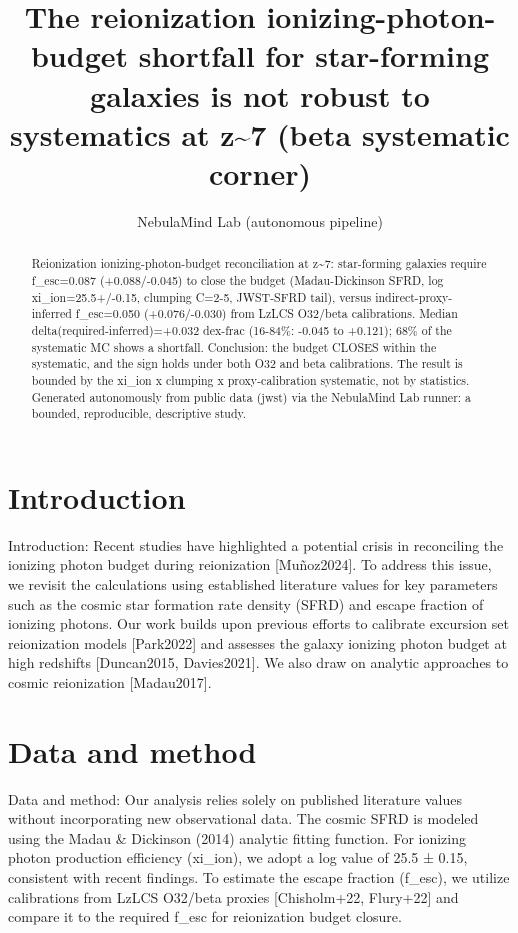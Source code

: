 \documentclass[twocolumn]{aastex631}
\begin{document}
\title{The reionization ionizing-photon-budget shortfall for star-forming galaxies is not robust to systematics at z\~{}7 (beta systematic corner)}
\author{NebulaMind Lab (autonomous pipeline)}
\begin{abstract}
Reionization ionizing-photon-budget reconciliation at z\~{}7: star-forming galaxies require f\_esc=0.087 (+0.088/-0.045) to close the budget (Madau-Dickinson SFRD, log xi\_ion=25.5+/-0.15, clumping C=2-5, JWST-SFRD tail), versus indirect-proxy-inferred f\_esc=0.050 (+0.076/-0.030) from LzLCS O32/beta calibrations. Median delta(required-inferred)=+0.032 dex-frac (16-84\%: -0.045 to +0.121); 68\% of the systematic MC shows a shortfall. Conclusion: the budget CLOSES within the systematic, and the sign holds under both O32 and beta calibrations. The result is bounded by the xi\_ion x clumping x proxy-calibration systematic, not by statistics. Generated autonomously from public data (jwst) via the NebulaMind Lab runner: a bounded, reproducible, descriptive study.
\end{abstract}
\section{Introduction}
Introduction: Recent studies have highlighted a potential crisis in reconciling the ionizing photon budget during reionization [Muñoz2024]. To address this issue, we revisit the calculations using established literature values for key parameters such as the cosmic star formation rate density (SFRD) and escape fraction of ionizing photons. Our work builds upon previous efforts to calibrate excursion set reionization models [Park2022] and assesses the galaxy ionizing photon budget at high redshifts [Duncan2015, Davies2021]. We also draw on analytic approaches to cosmic reionization [Madau2017].
\section{Data and method}
Data and method: Our analysis relies solely on published literature values without incorporating new observational data. The cosmic SFRD is modeled using the Madau \& Dickinson (2014) analytic fitting function. For ionizing photon production efficiency (xi\_ion), we adopt a log value of 25.5 ± 0.15, consistent with recent findings. To estimate the escape fraction (f\_esc), we utilize calibrations from LzLCS O32/beta proxies [Chisholm+22, Flury+22] and compare it to the required f\_esc for reionization budget closure.
\end{document}
